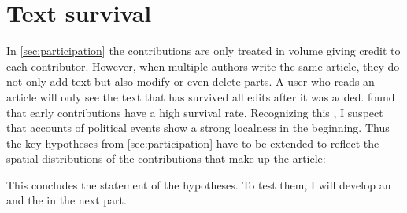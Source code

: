 



\section{Text survival}\label{sec:textsurvival}

In \ref{sec:participation} the contributions are only treated in volume giving credit to each contributor.
However, when multiple authors write the same article, they do not only add text but also modify or even delete parts.
A user who reads an article will only see the text that has survived all edits after it was added.
\textcite{viegas2004history} found that early contributions have a high survival rate.
Recognizing this , I suspect that accounts of political events show a strong localness in the beginning.
Thus the key hypotheses from \ref{sec:participation} have to be extended to reflect the spatial distributions of the contributions that make up the article:



This concludes the statement of the hypotheses. 
To test them, I will develop an  and the   in the next part.
